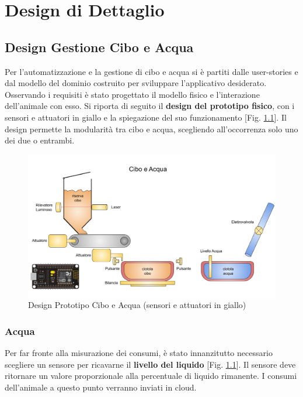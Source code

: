 \chapter{Design di Dettaglio}

\section{Design Gestione Cibo e Acqua}
    Per l'automatizzazione e la gestione di cibo e acqua si è partiti dalle user-stories e dal modello del dominio costruito per sviluppare l'applicativo desiderato. Osservando i requisiti è stato progettato il modello fisico e l'interazione dell'animale con esso. 
    Si riporta di seguito il \textbf{design del prototipo fisico}, con i sensori e attuatori in giallo e la spiegazione del suo funzionamento [Fig. \ref{fig:ciboacqua}].
    Il design permette la modularità tra cibo e acqua, scegliendo all'occorrenza solo uno dei due o entrambi.
    \begin{figure}[H]
        \caption{Design Prototipo Cibo e Acqua (sensori e attuatori in giallo)}
        \label{fig:ciboacqua}
        \centering
        \includegraphics[width=1\textwidth]{Images/CiboAcqua.png}
    \end{figure}

    
    \subsection{Acqua}
    Per far fronte alla misurazione dei consumi, è stato innanzitutto necessario scegliere un sensore per ricavarne il \textbf{livello del liquido} [Fig. \ref{fig:ciboacqua}]. Il sensore deve ritornare un valore proporzionale alla percentuale di liquido rimanente. I consumi dell'animale a questo punto verranno inviati in cloud.
    
